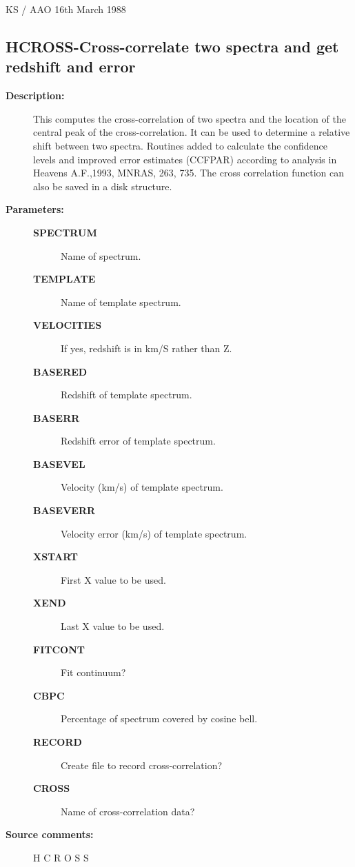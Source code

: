 \begin{description}
\begin{description}
\begin{terminalv}
                                 KS / AAO 16th March 1988
\end{terminalv}
\end{description}
\subsection{HCROSS-\label{HCROSS}Cross-correlate two spectra and get redshift and error}
\begin{description}

\item [\textbf{Description:}]
 This computes the cross-correlation of two spectra and
 the location of the central peak of the cross-correlation.
 It can be used to determine a relative shift between two
 spectra. Routines added to calculate the confidence levels
 and improved error estimates (CCFPAR) according to analysis
 in Heavens A.F.,1993, MNRAS, 263, 735.  The cross correlation
 function can also be saved in a disk structure.


\item [\textbf{Parameters:}]
\begin{description}
\item [\textbf{SPECTRUM}]
 Name of spectrum.
\item [\textbf{TEMPLATE}]
 Name of template spectrum.
\item [\textbf{VELOCITIES}]
 If yes, redshift is in km/S rather than Z.
\item [\textbf{BASERED}]
 Redshift of template spectrum.
\item [\textbf{BASERR}]
 Redshift error of template spectrum.
\item [\textbf{BASEVEL}]
 Velocity (km/s) of template spectrum.
\item [\textbf{BASEVERR}]
 Velocity error (km/s) of template spectrum.
\item [\textbf{XSTART}]
 First X value to be used.
\item [\textbf{XEND}]
 Last X value to be used.
\item [\textbf{FITCONT}]
 Fit continuum?
\item [\textbf{CBPC}]
 Percentage of spectrum covered by cosine bell.
\item [\textbf{RECORD}]
 Create file to record cross-correlation?
\item [\textbf{CROSS}]
 Name of cross-correlation data?
\end{description}

\item [\textbf{Source comments:}]
\begin{terminalv}
 H C R O S S


\end{terminalv}
\end{description}
\end{description}
